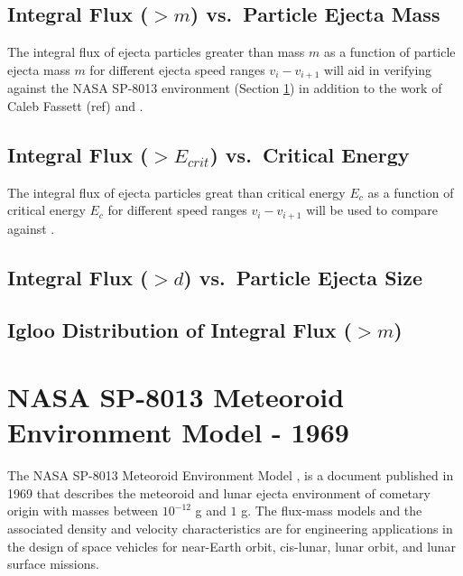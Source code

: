 \documentclass{hitec}
\begin{document}
\subsection{Integral Flux ($>m$) vs.\ Particle Ejecta Mass}\label{ssec:IntFlux_m_m}

The integral flux of ejecta particles greater than mass $m$ as a function of particle ejecta mass $m$ for different ejecta speed ranges $v_{i}-v_{i+1}$ will aid in verifying against the NASA SP-8013 environment (Section \ref{sec:NASA SP-8013 Meteoroid Environment Model}) in addition to the work of Caleb Fassett (ref) and \cite{bjorkman2019astronaut}.


\subsection{Integral Flux ($>E_{crit}$) vs.\ Critical Energy}\label{ssec:IntFlux_Ec_Ec}

The integral flux of ejecta particles great than critical energy $E_c$ as a function of critical energy $E_c$ for different speed ranges $v_{i}-v_{i+1}$ will be used to compare against \cite{bjorkman2019astronaut}.


\subsection{Integral Flux ($>d$) vs.\ Particle Ejecta Size}\label{ssec:IntFlux_d_d}


\subsection{Igloo Distribution of Integral Flux ($>m$)}\label{ssec:IglooIntFlux_m}





\section{NASA SP-8013 Meteoroid Environment Model - 1969}\label{sec:NASA SP-8013 Meteoroid Environment Model}

The NASA SP-8013 Meteoroid Environment Model \citep{cour1969meteoroid}, is a document published in 1969 that describes the meteoroid and lunar ejecta environment of cometary origin with masses between $10^{-12}$ g and $1$ g. The flux-mass models and the associated density and velocity characteristics are for engineering applications in the design of space vehicles for near-Earth orbit, cis-lunar, lunar orbit, and lunar surface missions.
\end{document}
